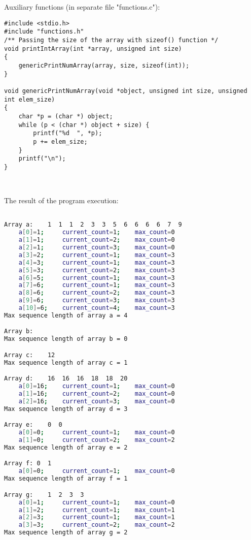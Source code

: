 \documentclass{article}
\begin{document}
\paragraph{}\

	\rmfamily
	
	Auxiliary functions (in separate file "functions.c"):
	
	\begin{verbatim} 
#include <stdio.h>
#include "functions.h"
/** Passing the size of the array with sizeof() function */
void printIntArray(int *array, unsigned int size)
{
    genericPrintNumArray(array, size, sizeof(int));
}

void genericPrintNumArray(void *object, unsigned int size, unsigned int elem_size) 
{
    char *p = (char *) object;
    while (p < (char *) object + size) {
        printf("%d  ", *p);
        p += elem_size;
    }
    printf("\n");
}

\end{verbatim}




	
	\rmfamily\
	
		\noindent The result of the program execution:
		
	\ttfamily
	\begin{lstlisting}[language=bash]

Array a:    1  1  1  2  3  3  5  6  6  6  6  7  9
    a[0]=1; 	current_count=1; 	max_count=0
    a[1]=1; 	current_count=2; 	max_count=0
    a[2]=1; 	current_count=3; 	max_count=0
    a[3]=2; 	current_count=1; 	max_count=3
    a[4]=3; 	current_count=1; 	max_count=3
    a[5]=3; 	current_count=2; 	max_count=3
    a[6]=5; 	current_count=1; 	max_count=3
    a[7]=6; 	current_count=1; 	max_count=3
    a[8]=6; 	current_count=2; 	max_count=3
    a[9]=6; 	current_count=3; 	max_count=3
    a[10]=6; 	current_count=4; 	max_count=3
Max sequence length of array a = 4

Array b:
Max sequence length of array b = 0

Array c:    12
Max sequence length of array c = 1

Array d:    16  16  16  18  18  20
    a[0]=16; 	current_count=1; 	max_count=0
    a[1]=16; 	current_count=2; 	max_count=0
    a[2]=16; 	current_count=3; 	max_count=0
Max sequence length of array d = 3

Array e:    0  0
    a[0]=0; 	current_count=1; 	max_count=0
    a[1]=0; 	current_count=2; 	max_count=2
Max sequence length of array e = 2

Array f: 0  1
    a[0]=0; 	current_count=1; 	max_count=0
Max sequence length of array f = 1

Array g:    1  2  3  3
    a[0]=1; 	current_count=1; 	max_count=0
    a[1]=2; 	current_count=1; 	max_count=1
    a[2]=3; 	current_count=1; 	max_count=1
    a[3]=3; 	current_count=2; 	max_count=2
Max sequence length of array g = 2

	\end{lstlisting}
	
\end{document}
